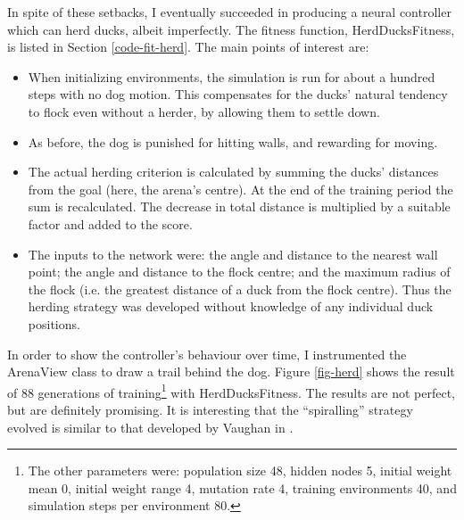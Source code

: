 \documentclass[a4paper]{report}
\newcommand{\code}[1]{{\ttfamily #1}}
\begin{document}
In spite of these setbacks, I eventually succeeded in producing a
neural controller which can herd ducks, albeit imperfectly.  The
fitness function, \code{HerdDucksFitness}, is listed in Section
\ref{code-fit-herd}. The main points of interest are:

\begin{itemize}

\item When initializing environments, the simulation is run for about
  a hundred steps with no dog motion. This compensates for the ducks'
  natural tendency to flock even without a herder, by allowing them to
  settle down.

\item As before, the dog is punished for hitting walls, and rewarding
  for moving.

\item The actual herding criterion is calculated by summing the ducks'
  distances from the goal (here, the arena's centre). At the end of
  the training period the sum is recalculated. The decrease in total
  distance is multiplied by a suitable factor and added to the score.
  
\item The inputs to the network were: the angle and distance to the
  nearest wall point; the angle and distance to the flock centre; and
  the maximum radius of the flock (i.e. the greatest distance of a
  duck from the flock centre). Thus the herding strategy was developed
  without knowledge of any individual duck positions.

\end{itemize}

In order to show the controller's behaviour over time, I instrumented
the \code{ArenaView} class to draw a trail behind the dog. Figure
\ref{fig-herd} shows the result of 88 generations of
training\footnote{The other parameters were: population size 48,
  hidden nodes 5, initial weight mean 0, initial weight range 4,
  mutation rate 4, training environments 40, and simulation steps per
  environment 80.} with \code{HerdDucksFitness}. The results are not
perfect, but are definitely promising. It is interesting that the
``spiralling'' strategy evolved is similar to that developed by
Vaughan in \cite{vaughan98}.
\end{document}
